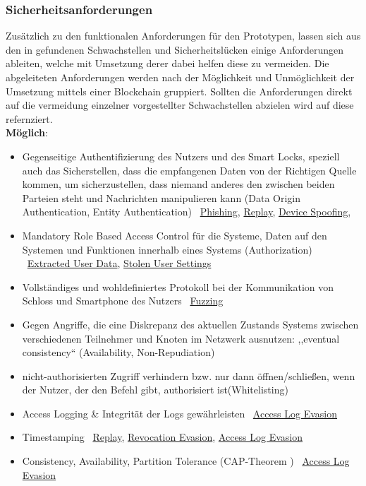 \subsubsection{Sicherheitsanforderungen}
\label{sec:prototype_sec}
    Zusätzlich zu den funktionalen Anforderungen für den Prototypen, lassen sich aus den in  gefundenen Schwachstellen und Sicherheitslücken einige Anforderungen ableiten, welche mit Umsetzung derer dabei helfen diese zu vermeiden.
    Die abgeleiteten Anforderungen werden nach der Möglichkeit und Unmöglichkeit der Umsetzung mittels einer Blockchain gruppiert.
    Sollten die Anforderungen direkt auf die vermeidung einzelner vorgestellter Schwachstellen abzielen wird auf diese refernziert.\bigskip\\
    \noindent \textbf{Möglich}:
    \begin{itemize}
        \item Gegenseitige Authentifizierung des Nutzers und des Smart Locks, speziell auch das Sicherstellen, dass die empfangenen Daten von der Richtigen Quelle kommen, um sicherzustellen, dass niemand anderes den zwischen beiden Parteien steht und Nachrichten manipulieren kann (Data Origin Authentication, Entity Authentication) \textrightarrow\ \hyperref[vuln:phishing]{Phishing}, \hyperref[vuln:replay]{Replay}, \hyperref[vuln:spoofing]{Device Spoofing}, 
        \item Mandatory Role Based Access Control für die Systeme, Daten auf den Systemen und Funktionen innerhalb eines Systems (Authorization) \cite{Miessler2015} \textrightarrow\ \hyperref[vuln:userdata]{Extracted User Data}, \hyperref[vuln:usersettings]{Stolen User Settings}
        \item Vollständiges und wohldefiniertes Protokoll bei der Kommunikation von Schloss und Smartphone des Nutzers \textrightarrow\ \hyperref[vuln:fuzzing]{Fuzzing}
        \item Gegen Angriffe, die eine Diskrepanz des aktuellen Zustands Systems zwischen verschiedenen Teilnehmer und Knoten im Netzwerk ausnutzen: \textrightarrow ,,eventual consistency`` (Availability, Non-Repudiation)\cite{Ho2016}
        \item nicht-authorisierten Zugriff verhindern bzw. nur dann öffnen/schließen, wenn der Nutzer, der den Befehl gibt, authorisiert ist(Whitelisting) \cite{Ho2016}
        \item Access Logging \& Integrität der Logs gewährleisten \textrightarrow\ \hyperref[vuln:accesslogevasion]{Access Log Evasion}
        \item Timestamping \textrightarrow\ \hyperref[vuln:replay]{Replay}, \hyperref[vuln:revocationevasion]{Revocation Evasion}, \hyperref[vuln:accesslogevasion]{Access Log Evasion}
        \item Consistency, Availability, Partition Tolerance (CAP-Theorem \cite{Brewer2012}) \textrightarrow\ \hyperref[vuln:accesslogevasion]{Access Log Evasion}
    \end{itemize}
